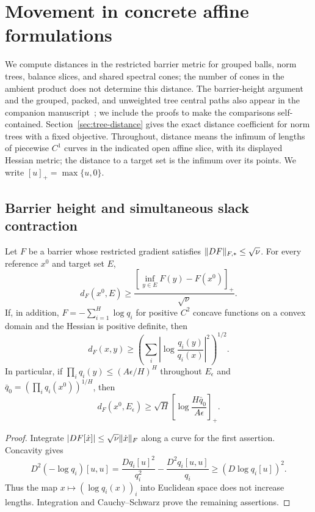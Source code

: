 \section{Movement in concrete affine formulations}
\label{sec:concrete-movement}

We compute distances in the restricted barrier metric for grouped
balls, norm trees, balance slices, and shared spectral cones; the number
of cones in the ambient product does not determine this distance.  The
barrier-height argument and the grouped, packed, and unweighted tree
central paths also appear in the companion
manuscript~\cite{CentralPathCompanion}; we include the proofs to make
the comparisons self-contained.  Section~\ref{sec:tree-distance} gives
the exact distance coefficient for norm trees with a fixed objective.
Throughout, distance means the infimum of lengths of piecewise $C^1$
curves in the indicated open affine slice, with its displayed Hessian
metric; the distance to a target set is the infimum over its points.
We write $[u]_+=\max\{u,0\}$.

\subsection{Barrier height and simultaneous slack contraction}

\begin{lemma}\label{lem:cm-height}
Let $F$ be a barrier whose restricted gradient satisfies
$\lVert DF\rVert_{F,*}\leq\sqrt\nu$.  For every reference $x^0$ and target
set $E$,
\begin{equation}\label{eq:cm-height}
 d_F(x^0,E)\geq
 \frac{[\inf_{y\in E}F(y)-F(x^0)]_+}{\sqrt\nu}.
\end{equation}
If, in addition, $F=-\sum_{i=1}^H\log q_i$ for positive $C^2$
concave functions on a convex domain and the Hessian is positive
definite, then
\begin{equation}\label{eq:cm-log-slack}
 d_F(x,y)\geq
 \left(\sum_i\left|\log\frac{q_i(y)}{q_i(x)}\right|^2\right)^{1/2}.
\end{equation}
In particular, if $\prod_iq_i(y)\leq(A\epsilon/H)^H$ throughout
$E_\epsilon$ and $\bar q_0=(\prod_iq_i(x^0))^{1/H}$, then
\[
 d_F(x^0,E_\epsilon)\geq
 \sqrt H\left[\log\frac{H\bar q_0}{A\epsilon}\right]_+.
\]
\end{lemma}
\begin{proof}
Integrate $|DF[\dot x]|\leq\sqrt\nu\lVert \dot x\rVert_F$ along a
curve for the first assertion.  Concavity gives
\[
 D^2(-\log q_i)[u,u]
 =\frac{Dq_i[u]^2}{q_i^2}-\frac{D^2q_i[u,u]}{q_i}
 \geq (D\log q_i[u])^2.
\]
Thus the map $x\mapsto(\log q_i(x))_i$ into Euclidean space does not
increase lengths.
Integration and Cauchy--Schwarz prove the remaining assertions.
\end{proof}


